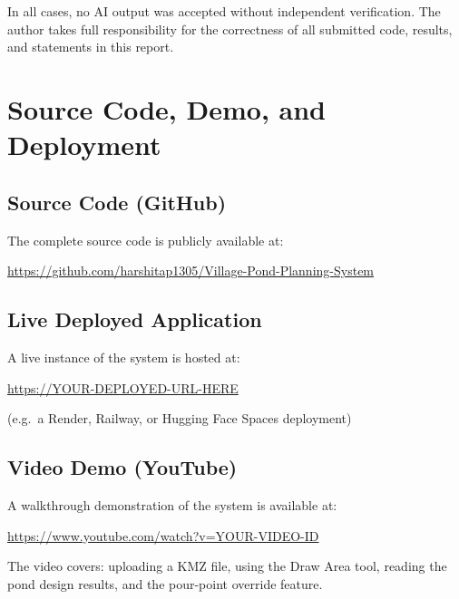 \documentclass[manuscript,screen,review,nonacm]{acmart}
\begin{document}
In all cases, no AI output was accepted without independent verification.
The author takes full responsibility for the correctness of all submitted
code, results, and statements in this report.

\appendix

\section{Source Code, Demo, and Deployment}

\subsection*{Source Code (GitHub)}
The complete source code is publicly available at:
\begin{center}
  \url{https://github.com/harshitap1305/Village-Pond-Planning-System}
\end{center}

\subsection*{Live Deployed Application}
A live instance of the system is hosted at:
\begin{center}
  \url{https://YOUR-DEPLOYED-URL-HERE}  %
\end{center}
(e.g.\ a Render, Railway, or Hugging Face Spaces deployment)

\subsection*{Video Demo (YouTube)}
A walkthrough demonstration of the system is available at:
\begin{center}
  \url{https://www.youtube.com/watch?v=YOUR-VIDEO-ID}  %
\end{center}
The video covers: uploading a KMZ file, using the Draw Area tool, reading
the pond design results, and the pour-point override feature.
\end{document}

